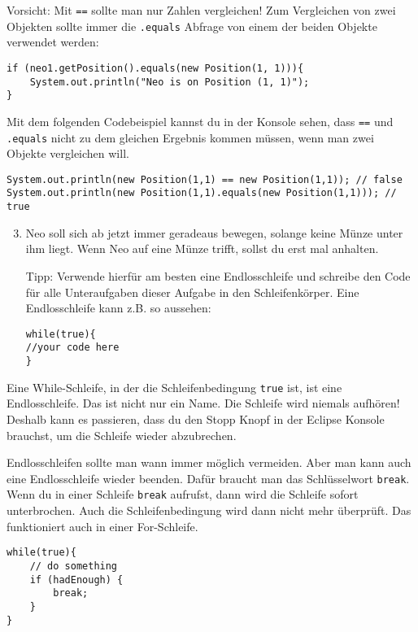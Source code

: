 \begin{Infobox}[\lstinline{==} und \lstinline{.equals()}]
	Vorsicht: Mit \lstinline{==} sollte man nur Zahlen vergleichen! 
	Zum Vergleichen von zwei Objekten sollte immer die \lstinline{.equals} Abfrage von einem der beiden Objekte verwendet werden:

	\begin{lstlisting}[numbers=none]
if (neo1.getPosition().equals(new Position(1, 1))){
	System.out.println("Neo is on Position (1, 1)");
}
	\end{lstlisting}

	Mit dem folgenden Codebeispiel kannst du in der Konsole sehen, dass \lstinline{==} und \lstinline{.equals} nicht zu dem gleichen Ergebnis kommen müssen, wenn man zwei Objekte vergleichen will.

	\begin{lstlisting}[numbers=none]
System.out.println(new Position(1,1) == new Position(1,1)); // false
System.out.println(new Position(1,1).equals(new Position(1,1))); // true
	\end{lstlisting}

\end{Infobox}


\begin{enumerate}\setcounter{enumi}{2}
	\item
		Neo soll sich ab jetzt immer geradeaus bewegen, solange keine Münze unter ihm liegt.
		Wenn Neo auf eine Münze trifft, sollst du erst mal anhalten.

		Tipp: Verwende hierfür am besten eine Endlosschleife und schreibe den Code für alle Unteraufgaben dieser Aufgabe in den Schleifenkörper.
		Eine Endlosschleife kann z.B. so aussehen:
	\begin{lstlisting}
while(true){
//your code here
}
	\end{lstlisting}
\end{enumerate}


\begin{Infobox}
	Eine While-Schleife, in der die Schleifenbedingung \lstinline{true} ist, ist eine Endlosschleife.
	Das ist nicht nur ein Name.
	Die Schleife wird niemals aufhören!
	Deshalb kann es passieren, dass du den Stopp Knopf in der Eclipse Konsole brauchst, um die Schleife wieder abzubrechen.

	Endlosschleifen sollte man wann immer möglich vermeiden.
	Aber man kann auch eine Endlosschleife wieder beenden.
	Dafür braucht man das Schlüsselwort \lstinline{break}.
	Wenn du in einer Schleife \lstinline{break} aufrufst, dann wird die Schleife sofort unterbrochen.
	Auch die Schleifenbedingung wird dann nicht mehr überprüft.
	Das funktioniert auch in einer For-Schleife.
	
	\begin{lstlisting}[numbers=none]
while(true){
    // do something
    if (hadEnough) {
        break;
    }
}
	\end{lstlisting}

\end{Infobox}


